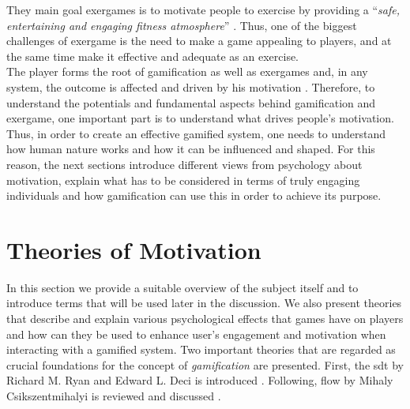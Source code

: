 They main goal exergames is to motivate people to exercise by providing a ``\textit{safe, entertaining and engaging fitness atmosphere}'' \cite{altamimi2012survey}. Thus, one of the biggest challenges of exergame is the need to make a game appealing to players, and at the same time make it effective and adequate as an exercise. \\
The player forms the root of gamification as well as exergames and, in any system, the outcome is affected and driven by his motivation \cite{zichermann2011gamification}. Therefore, to understand the potentials and fundamental aspects behind gamification and exergame, one important part is to understand what drives people's motivation. Thus, in  order  to  create  an  effective  gamified system, one needs to understand  how  human  nature  works  and  how  it can be influenced and shaped. For this reason, the next sections introduce different views from psychology about motivation, explain what has to be considered in terms of truly engaging individuals and how gamification can use this in order to achieve its purpose. 

\section{Theories of Motivation}
\label{chapter:motivation}
In this section we provide a suitable overview of the subject itself and to introduce terms that will be used later in the discussion. We also present theories that describe and explain various psychological effects that games have on players and how can they be used to enhance user's engagement and motivation when interacting with a gamified system. Two important theories that are regarded as crucial foundations for the concept of \textit{gamification} are presented. First, the \acrfull{sdt} by Richard M. Ryan and Edward L. Deci is introduced \cite{deci1994promoting, ryan2000intrinsic, ryan2000self, deci2000and}. Following, \acrfull{flow} by Mihaly Csikszentmihalyi is reviewed and discussed \cite{csikszentmihalyi1996flow}. 
